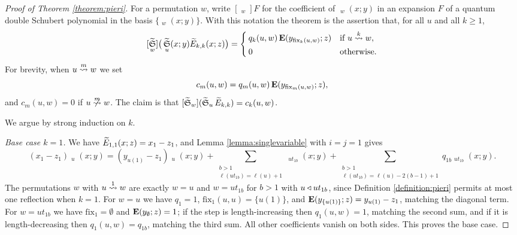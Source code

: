 \documentclass{amsart}
\theoremstyle{definition}
\theoremstyle{remark}
\numberwithin{equation}{section}
\DeclareMathOperator{\qsch}{\widetilde{\mathfrak{S}}}
\newcommand{\xrightsquigarrow}[2][]{%
	\mathrel{\mathop{\rightsquigarrow}\limits^{\scriptstyle #2}%
	\ifx\hfuzz#1\hfuzz\else_{\scriptstyle #1}\fi}%
}
\newcommand{\tom}[1]{\ensuremath{\xrightsquigarrow{#1}}}
\newcommand{\fx}{\mathrm{fix}}
\begin{document}
\begin{proof}[Proof of Theorem \ref{theorem:pieri}]
For a permutation $w$, write $[\qsch_w]F$ for the coefficient of $\qsch_w(x;y)$ in an expansion $F$ of a quantum double Schubert polynomial in the basis $\{\qsch_w(x;y)\}$. With this notation the theorem is the assertion that, for all $u$ and all $k\geq1$,
$$[\qsch_w]\big(\qsch_u(x;y)\qelem_{k,k}(x;z)\big)=\begin{cases}q_k(u,w)\,\wte(y_{\fx_{k}(u,w)};z) & \text{if }u\tom{k} w,\\[2pt] 0 & \text{otherwise.}\end{cases}$$
For brevity, when $u\tom{m} w$ we set
$$c_m(u,w)=q_m(u,w)\,\wte(y_{\fx_{m}(u,w)};z),$$
and $c_m(u,w)=0$ if $u\ntom{m}w$. The claim is that $[\qsch_w](\qsch_u\qelem_{k,k})=c_k(u,w)$.

We argue by strong induction on $k$.

\emph{Base case $k=1$.} We have $\widetilde{E}_{1,1}(x;z)=x_1-z_1$, and Lemma \ref{lemma:singlevariable} with $i=j=1$ gives
$$(x_1-z_1)\qsch_u(x;y)=(y_{u(1)}-z_1)\qsch_u(x;y)+\sum_{\substack{b>1\\\ell(ut_{1b})=\ell(u)+1}}\qsch_{ut_{1b}}(x;y)+\sum_{\substack{b>1\\\ell(ut_{1b})=\ell(u)-2(b-1)+1}}q_{1b}\qsch_{ut_{1b}}(x;y).$$
The permutations $w$ with $u\tom{1}w$ are exactly $w=u$ and $w=ut_{1b}$ for $b>1$ with $u\triangleleft ut_{1b}$, since Definition \ref{definition:pieri} permits at most one reflection when $k=1$. For $w=u$ we have $q_1=1$, $\fx_{1}(u,u)=\{u(1)\}$, and $\mathbf{E}(y_{\{u(1)\}};z)=y_{u(1)}-z_1$, matching the diagonal term. For $w=ut_{1b}$ we have $\fx_{1}=\emptyset$ and $\mathbf{E}(y_\emptyset;z)=1$; if the step is length-increasing then $q_1(u,w)=1$, matching the second sum, and if it is length-decreasing then $q_1(u,w)=q_{1b}$, matching the third sum. All other coefficients vanish on both sides. This proves the base case.


\end{proof}
\end{document}
